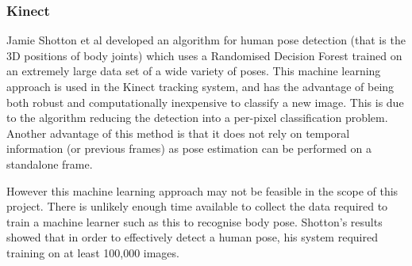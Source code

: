 \subsubsection{Kinect}

Jamie Shotton et al developed an algorithm\cite{shottonkinect} for human pose detection (that is the 3D positions of body joints) which uses a Randomised Decision Forest trained on an extremely large data set of a wide variety of poses. This machine learning approach is used in the Kinect tracking system, and has the advantage of being both robust and computationally inexpensive to classify a new image. This is due to the algorithm reducing the detection into a per-pixel classification problem. Another advantage of this method is that it does not rely on temporal information (or previous frames) as pose estimation can be performed on a standalone frame.

However this machine learning approach may not be feasible in the scope of this project. There is unlikely enough time available to collect the data required to train a machine learner such as this to recognise body pose. Shotton's results showed that in order to effectively detect a human pose, his system required training on at least 100,000 images\cite{shottonkinect}.